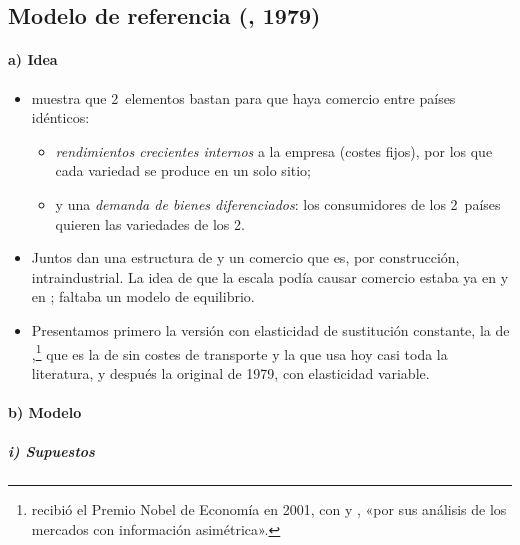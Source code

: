 \documentclass[11pt]{article}
\begin{document}
\subsection{Modelo de referencia (, 1979)}\label{sec:krugman}

\paragraph{a) Idea}

\begin{itemize}
\item \textcite{Krugman1979Increasing} muestra que 2~elementos bastan para que haya comercio entre países idénticos:
  \begin{itemize}
  \item \emph{rendimientos crecientes internos} a la empresa (costes fijos), por los que cada variedad se produce en un solo sitio;
  \item y una \emph{demanda de bienes diferenciados}: los consumidores de los 2~países quieren las variedades de los 2.
  \end{itemize}
\item Juntos dan una estructura de   y un comercio que es, por construcción, intraindustrial. La idea de que la escala podía causar comercio estaba ya en \textcite{Graham1923Some} y en \textcite{Ohlin1933Interregional}; faltaba un modelo de equilibrio.
\item Presentamos primero la versión con elasticidad de sustitución constante, la de \textcite{DixitStiglitz1977Monopolistic},\footnote{ recibió el Premio Nobel de Economía en 2001, con  y , «por sus análisis de los mercados con información asimétrica»\nocite{Nobel2001AkerlofSpenceStiglitz}.} que es la de \textcite{Krugman1980Scale} sin costes de transporte y la que usa hoy casi toda la literatura, y después la original de 1979, con elasticidad variable.
\end{itemize}

\paragraph{b) Modelo}

\subparagraph{i) Supuestos}
\end{document}
